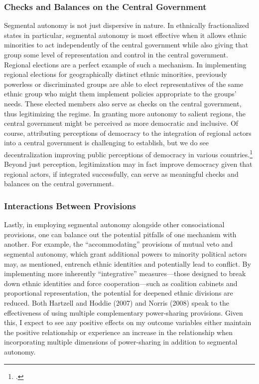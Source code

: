 \documentclass[12pt]{article}
\begin{document}
\subsubsection{Checks and Balances on the Central Government}
Segmental autonomy is not just dispersive in nature. In ethnically fractionalized states in particular, segmental autonomy is most effective when it allows ethnic minorities to act independently of the central government while also giving that group some level of representation and control in the central government. Regional elections are a perfect example of such a mechanism. In implementing regional elections for geographically distinct ethnic minorities, previously powerless or discriminated groups are able to elect representatives of the same ethnic group who might them implement policies appropriate to the groups' needs. These elected members also serve as checks on the central government, thus legitimizing the regime. In granting more autonomy to salient regions, the central government might be perceived as more democratic and inclusive. Of course, attributing perceptions of democracy to the integration of regional actors into a central government is challenging to establish, but we do see decentralization improving public perceptions of democracy in various countries.\footcite{escobarlemmon_does_2014, world_values_survey_world_nodate} Beyond just perception, legitimization may in fact improve democracy given that regional actors, if integrated successfully, can serve as meaningful checks and balances on the central government.

\subsubsection{Interactions Between Provisions}
Lastly, in employing segmental autonomy alongside other consociational provisions, one can balance out the potential pitfalls of one mechanism with another. For example, the ``accommodating'' provisions of mutual veto and segmental autonomy, which grant additional powers to minority political actors may, as mentioned, entrench ethnic identities and potentially lead to conflict. By implementing more inherently ``integrative'' measures---those designed to break down ethnic identities and force cooperation---such as coalition cabinets and proportional representation, the potential for deepened ethnic divisions are reduced. Both Hartzell and Hoddie (2007) and Norris (2008) speak to the effectiveness of using multiple complementary power-sharing provisions. Given this, I expect to see any positive effects on my outcome variables either maintain the positive relationship or experience an increase in the relationship when incorporating multiple dimensions of power-sharing in addition to segmental autonomy.
\end{document}
